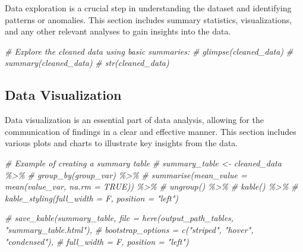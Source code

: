\documentclass[
  12pt,
]{article}
\newenvironment{Shaded}{\begin{snugshade}}{\end{snugshade}}
\newcommand{\CommentTok}[1]{\textcolor[rgb]{0.56,0.35,0.01}{\textit{#1}}}
\begin{document}
Data exploration is a crucial step in understanding the dataset and
identifying patterns or anomalies. This section includes summary
statistics, visualizations, and any other relevant analyses to gain
insights into the data.

\begin{Shaded}
\begin{Highlighting}[]
\CommentTok{\# Explore the cleaned data using basic summaries:}
\CommentTok{\# glimpse(cleaned\_data)}
\CommentTok{\# summary(cleaned\_data)}
\CommentTok{\# str(cleaned\_data)}
\end{Highlighting}
\end{Shaded}

\subsection{Data Visualization}\label{data-visualization}

Data visualization is an essential part of data analysis, allowing for
the communication of findings in a clear and effective manner. This
section includes various plots and charts to illustrate key insights
from the data.

\begin{Shaded}
\begin{Highlighting}[]
\CommentTok{\# Example of creating a summary table}
\CommentTok{\# summary\_table \textless{}{-} cleaned\_data \%\textgreater{}\%}
\CommentTok{\#   group\_by(group\_var) \%\textgreater{}\%}
\CommentTok{\#   summarise(mean\_value = mean(value\_var, na.rm = TRUE)) \%\textgreater{}\%}
\CommentTok{\#   ungroup() \%\textgreater{}\%}
\CommentTok{\#   kable() \%\textgreater{}\%}
\CommentTok{\#   kable\_styling(full\_width = F, position = "left")}

\CommentTok{\# save\_kable(summary\_table, file = here(output\_path\_tables, "summary\_table.html"),}
\CommentTok{\#   bootstrap\_options = c("striped", "hover", "condensed"),}
\CommentTok{\#   full\_width = F, position = "left")}
\end{Highlighting}
\end{Shaded}
\end{document}

